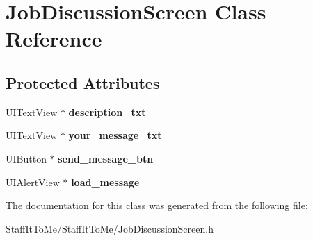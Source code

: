 \hypertarget{interface_job_discussion_screen}{
\section{\-Job\-Discussion\-Screen \-Class \-Reference}
\label{interface_job_discussion_screen}
}
\subsection*{\-Protected \-Attributes}
\begin{DoxyCompactItemize}
\item 
\hypertarget{interface_job_discussion_screen_a7b4866d0b0575c4afe8d99d0601a948e}{
\-U\-I\-Text\-View $\ast$ {\bfseries description\-\_\-txt}}
\label{interface_job_discussion_screen_a7b4866d0b0575c4afe8d99d0601a948e}

\item 
\hypertarget{interface_job_discussion_screen_ac9e59864039a044c24076f89f9c13ddd}{
\-U\-I\-Text\-View $\ast$ {\bfseries your\-\_\-message\-\_\-txt}}
\label{interface_job_discussion_screen_ac9e59864039a044c24076f89f9c13ddd}

\item 
\hypertarget{interface_job_discussion_screen_a945913c86bf99e15d4d7094da4fde725}{
\-U\-I\-Button $\ast$ {\bfseries send\-\_\-message\-\_\-btn}}
\label{interface_job_discussion_screen_a945913c86bf99e15d4d7094da4fde725}

\item 
\hypertarget{interface_job_discussion_screen_a3ffcfcf64c73e015945deb639568236c}{
\-U\-I\-Alert\-View $\ast$ {\bfseries load\-\_\-message}}
\label{interface_job_discussion_screen_a3ffcfcf64c73e015945deb639568236c}

\end{DoxyCompactItemize}


\-The documentation for this class was generated from the following file\-:\begin{DoxyCompactItemize}
\item 
\-Staff\-It\-To\-Me/\-Staff\-It\-To\-Me/\-Job\-Discussion\-Screen.\-h\end{DoxyCompactItemize}
